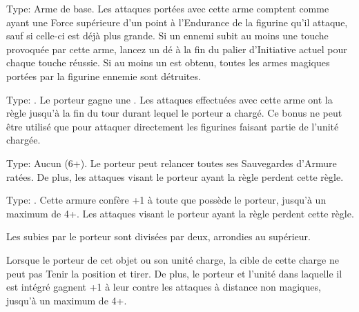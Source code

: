 \startarmymagicalitems

\armymagicalweapons

\startpricelist

 Type: Arme de base. Les attaques portées avec cette arme comptent comme ayant une Force supérieure d'un point à l'Endurance de la figurine qu'il attaque, sauf si celle-ci est déjà plus grande. Si un ennemi subit au moins une touche provoquée par cette arme, lancez un dé à la fin du palier d'Initiative actuel pour chaque touche réussie. Si au moins un  est obtenu, toutes les armes magiques portées par la figurine ennemie sont détruites.

 Type: \lance{}. Le porteur gagne une . Les attaques effectuées avec cette arme ont la règle  jusqu'à la fin du tour durant lequel le porteur a chargé. Ce bonus ne peut être utilisé que pour attaquer directement les figurines faisant partie de l'unité chargée.

\endpricelist

\armymagicalarmour

\startpricelist

 Type: Aucun (6+). Le porteur peut relancer toutes ses Sauvegardes d'Armure ratées. De plus, les attaques visant le porteur ayant la règle  perdent cette règle.

 Type: \ha{}. Cette armure confère +1 à toute \wardsave{} que possède le porteur, jusqu'à un maximum de 4+. Les attaques visant le porteur ayant la règle \holyattacks{} perdent cette règle.

\endpricelist

\armytalismans

\startpricelist

 Les \multiplewounds{}{} subies par le porteur sont divisées par deux, arrondies au supérieur.

 Lorsque le porteur de cet objet ou son unité charge, la cible de cette charge ne peut pas Tenir la position et tirer. De plus, le porteur et l'unité dans laquelle il est intégré gagnent +1 à leur \wardsave{} contre les attaques à distance non magiques, jusqu'à un maximum de 4+.

\endpricelist

\armyenchanteditems

